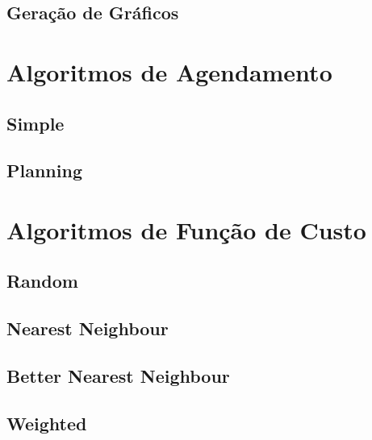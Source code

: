\subsection{\label{model:report:charts}Geração de Gráficos}
\lipsum[5]

\section{\label{model:schedulers}Algoritmos de Agendamento}
\lipsum[5]

\subsection{\label{model:schedulers:simple}Simple}
\lipsum[5]

\subsection{\label{model:schedulers:planning}Planning}
\lipsum[5]

\section{\label{model:costfunctions}Algoritmos de Função de Custo}
\lipsum[5]

\subsection{\label{model:costfunctions:random}Random}
\lipsum[5]

\subsection{\label{model:costfunctions:nn}Nearest Neighbour}
\lipsum[5]

\subsection{\label{model:costfunctions:bnn}Better Nearest Neighbour}
\lipsum[5]

\subsection{\label{model:costfunctions:weighted}Weighted}
\lipsum[5]






